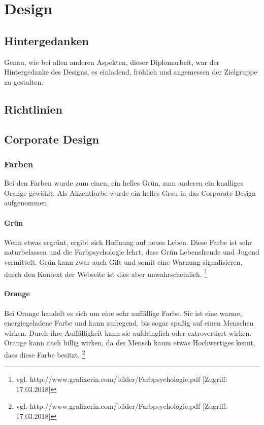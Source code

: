 \chapter{Design}
\renewcommand{\kapitelautor}{Autor: Niklas Kienreich}

\section{Hintergedanken}
Genau, wie bei allen anderen Aspekten, dieser Diplomarbeit, war der Hintergedanke des Designs, es einladend, fröhlich und angemessen der Zielgruppe zu gestalten.

\section{Richtlinien}
\section{Corporate Design}
\subsection{Farben}
Bei den Farben wurde zum einen, ein helles Grün, zum anderen ein knalliges Orange gewählt. Als Akzentfarbe wurde ein helles Grau in das Corporate Design aufgenommen.

\subsubsection{Grün}
Wenn etwas ergrünt, ergibt sich Hoffnung auf neues Leben. Diese Farbe ist sehr naturbelassen und die Farbpsychologie lehrt, dass Grün Lebensfreude und Jugend vermittelt. Grün kann zwar auch Gift und somit eine Warnung signalisieren, durch den Kontext der Webseite ist dies aber unwahrscheinlich. \footnote{\label{} vgl. http://www.grafixerin.com/bilder/Farbpsychologie.pdf [Zugriff: 17.03.2018]}

\subsubsection{Orange}
Bei Orange handelt es sich um eine sehr auffällige Farbe. Sie ist eine warme, energiegeladene Farbe und kann aufregend, bis sogar spaßig auf einen Menschen wirken. Durch ihre Auffälligkeit kann sie aufdringlich oder extrovertiert wirken. Orange kann auch billig wirken, da der Mensch kaum etwas Hochwertiges kennt, dass diese Farbe besitzt. \footnote{\label{} vgl. http://www.grafixerin.com/bilder/Farbpsychologie.pdf [Zugriff: 17.03.2018]}

